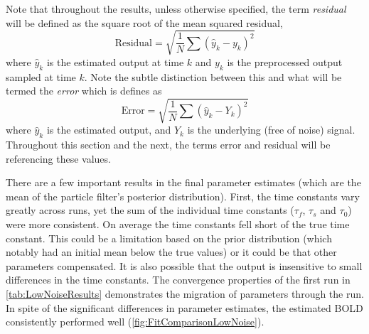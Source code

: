 Note that throughout the results, unless otherwise specified,
the term \emph{residual} will be defined as the square root of the mean squared residual,
\begin{equation}
\text{Residual} = \sqrt{\frac{1}{N}\sum (\hat{y}_k - y_k)^2}
\end{equation}
where $\hat{y}_k$ is the estimated output at time $k$ and $y_k$ is the preprocessed output
sampled at time $k$. Note the subtle distinction between this and what will be
termed the \emph{error} which is defines as
\begin{equation}
\text{Error} = \sqrt{\frac{1}{N}\sum (\hat{y}_k - Y_k)^2}
\end{equation}
where $\hat{y}_k$ is the estimated output, and $Y_k$ is the underlying (free of noise)
signal. Throughout this section and the next, the terms error and residual
will be referencing these values.

There are a few important results in the final parameter estimates (which
are the mean of the particle filter's posterior distribution). First, the time constants vary
greatly across
runs, yet the sum of the individual time constants
($\tau_f$, $\tau_s$ and $\tau_0$) were more consistent. On average the
time constants fell short of the true time constant. This could be a limitation
based on the prior distribution (which notably had an initial mean below the true values)
or it could be that other parameters compensated. It is also possible that the output is insensitive
to small differences in the time constants.
The convergence properties of the first run in \autoref{tab:LowNoiseResults}
demonstrates the migration of parameters through the run. In spite of the
significant differences in parameter estimates, the estimated BOLD
consistently performed well
(\autoref{fig:FitComparisonLowNoise}).


